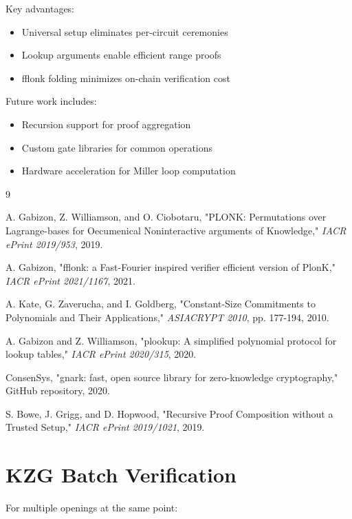 \documentclass[11pt,a4paper]{article}
\theoremstyle{definition}
\begin{document}
Key advantages:
\begin{itemize}
    \item Universal setup eliminates per-circuit ceremonies
    \item Lookup arguments enable efficient range proofs
    \item fflonk folding minimizes on-chain verification cost
\end{itemize}

Future work includes:
\begin{itemize}
    \item Recursion support for proof aggregation
    \item Custom gate libraries for common operations
    \item Hardware acceleration for Miller loop computation
\end{itemize}

\begin{thebibliography}{9}

A. Gabizon, Z. Williamson, and O. Ciobotaru, "PLONK: Permutations over Lagrange-bases for Oecumenical Noninteractive arguments of Knowledge," \textit{IACR ePrint 2019/953}, 2019.

A. Gabizon, "fflonk: a Fast-Fourier inspired verifier efficient version of PlonK," \textit{IACR ePrint 2021/1167}, 2021.

A. Kate, G. Zaverucha, and I. Goldberg, "Constant-Size Commitments to Polynomials and Their Applications," \textit{ASIACRYPT 2010}, pp. 177-194, 2010.

A. Gabizon and Z. Williamson, "plookup: A simplified polynomial protocol for lookup tables," \textit{IACR ePrint 2020/315}, 2020.

ConsenSys, "gnark: fast, open source library for zero-knowledge cryptography," GitHub repository, 2020.

S. Bowe, J. Grigg, and D. Hopwood, "Recursive Proof Composition without a Trusted Setup," \textit{IACR ePrint 2019/1021}, 2019.

\end{thebibliography}

\appendix

\section{KZG Batch Verification}

For multiple openings at the same point:
\end{document}
